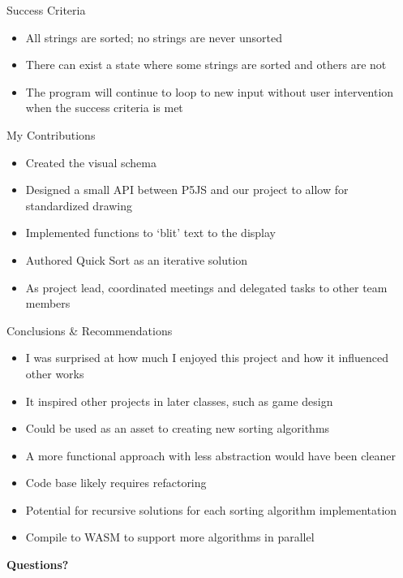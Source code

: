 \documentclass{beamer}
\begin{document}
\begin{frame}{Success Criteria}

\begin{itemize}
\item All strings are sorted; no strings are never unsorted
\item There can exist a state where some strings are sorted and others are not
		\item The program will continue to loop to new input without user intervention when the success criteria is met
		\end{itemize}

		\end{frame}


\begin{frame}{My Contributions}
\begin{itemize}
		\item Created the visual schema
		\item Designed a small API between P5JS and our project to allow for standardized drawing
		\item Implemented functions to `blit' text to the display
		\item Authored Quick Sort as an iterative solution
		\item As project lead, coordinated meetings and delegated tasks to other team members
\end{itemize}



\end{frame}

\begin{frame}{Conclusions \& Recommendations}
\begin{itemize}
		\item I was surprised at how much I enjoyed this project and how it influenced other works
		\item It inspired other projects in later classes, such as game design
		\item Could be used as an asset to creating new sorting algorithms
		\item A more functional approach with less abstraction would have been cleaner
		\item Code base likely requires refactoring
		\item Potential for recursive solutions for each sorting algorithm implementation
		\item Compile to WASM to support more algorithms in parallel
\end{itemize}
\end{frame}

\begin{frame}

\begin{center}
\textbf{\Large Questions?}
\end{center}

\end{frame}
\end{document}
